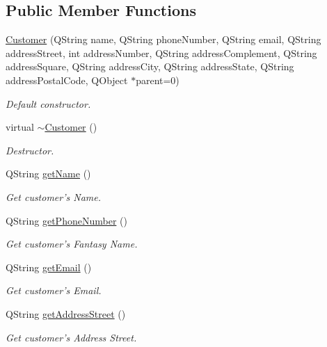 \subsection*{\-Public \-Member \-Functions}
\begin{DoxyCompactItemize}
\item 
\hyperlink{class_customer_a26dc606361618896b07da1f7aa280297}{\-Customer} (\-Q\-String name, \-Q\-String phone\-Number, \-Q\-String email, \-Q\-String address\-Street, int address\-Number, \-Q\-String address\-Complement, \-Q\-String address\-Square, \-Q\-String address\-City, \-Q\-String address\-State, \-Q\-String address\-Postal\-Code, \-Q\-Object $\ast$parent=0)
\begin{DoxyCompactList}\small\item\em \-Default constructor. \end{DoxyCompactList}\item 
virtual \hyperlink{class_customer_ab93fb14683b0393b9c900109f77c2629}{$\sim$\-Customer} ()
\begin{DoxyCompactList}\small\item\em \-Destructor. \end{DoxyCompactList}\item 
\-Q\-String \hyperlink{class_customer_a4b4a5ec2275f5253357679d99b533eeb}{get\-Name} ()
\begin{DoxyCompactList}\small\item\em \-Get customer's \-Name. \end{DoxyCompactList}\item 
\-Q\-String \hyperlink{class_customer_a46d6eadaa8798504ea663bde4cac2282}{get\-Phone\-Number} ()
\begin{DoxyCompactList}\small\item\em \-Get customer's \-Fantasy \-Name. \end{DoxyCompactList}\item 
\-Q\-String \hyperlink{class_customer_a8a739fb0a4d92fc4e653428635583dd0}{get\-Email} ()
\begin{DoxyCompactList}\small\item\em \-Get customer's \-Email. \end{DoxyCompactList}\item 
\-Q\-String \hyperlink{class_customer_a45c175338a465893df0afca1a2b66a0c}{get\-Address\-Street} ()
\begin{DoxyCompactList}\small\item\em \-Get customer's \-Address \-Street. \end{DoxyCompactList}\item 

\end{DoxyCompactItemize}
